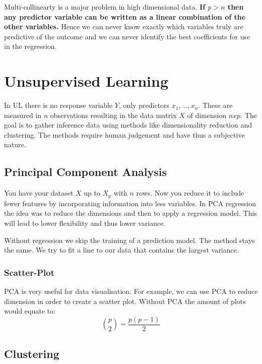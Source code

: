 \documentclass[../Main.tex]{subfiles}
\begin{document}
Multi-collinearty is a major problem 
in high dimensional data.
\textbf{If \(p>n\) then any predictor variable can be 
written as a linear combination of the other 
variables.}
Hence we can never know exactly which 
variables truly are predictive of the 
outcome and we can never identify the 
best coefficients for use in the regression.

\newpage
\section{Unsupervised Learning}
In UL there is no response variable \(Y\), only
predictors \(x_1,\dots ,x_n\). These are measured in
\(n\) observations resulting in the data matrix \(X\)
of dimension \(nxp\). The goal is to gather
inference data using methods like dimensionality reduction
and clustering. The methods require human judgement and have
thus a subjective nature.
\subsection{Principal Component Analysis}
You have your dataset \(X\) up to \(X_p\) with \(n\) rows.
Now you reduce it to include fewer features by incorporating
information into less variables. In PCA regression the idea
was to reduce the dimensions and then to apply a regression model.
This will lead to lower flexibility and thus lower variance.

Without regression we skip the training of a prediction model.
The method stays the same. We try to fit a line to our data
that contains the largest variance.

\subsubsection{Scatter-Plot}
PCA is very useful for data visualisation. For example, we
can use PCA to reduce dimension in order to create a scatter plot.
Without PCA the amount of plots would equate to:
\begin{equation}
    \binom{p}{2} = \frac{p(p-1)}{2}
\end{equation}



\subsection{Clustering}
\end{document}
